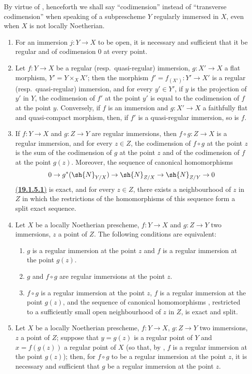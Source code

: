 By virtue of , henceforth we shall say ``codimension'' instead of ``transverse codimension'' when speaking of a subprescheme $Y$ regularly immersed in $X$, even when $X$ is not locally Noetherian.

\begin{proposition}[19.1.5]
\label{IV.19.1.5}
\medskip\noindent
\begin{enumerate}[label=(\roman*)]
  \item For an immersion $j:Y\to X$ to be open, it is necessary and sufficient that it be regular and of codimension $0$ at every point.
  \item Let $f:Y\to X$ be a regular (resp.\ quasi-regular) immersion, $g:X'\to X$ a flat morphism, $Y'=Y\times_X X'$; then the morphism $f'=f_{(X')}:Y'\to X'$ is a regular (resp.\ quasi-regular) immersion, and for every $y'\in Y'$, if $y$ is the projection of $y'$ in $Y$, the codimension of $f'$ at the point $y'$ is equal to the codimension of $f$ at the point $y$.
Conversely, if $f$ is an immersion and $g:X'\to X$ a faithfully flat and quasi-compact morphism, then, if $f'$ is a quasi-regular immersion, so is $f$.
  \item If $f:Y\to X$ and $g:Z\to Y$ are regular immersions, then $f\circ g:Z\to X$ is a regular immersion, and for every $z\in Z$, the codimension of $f\circ g$ at the point $z$ is the sum of the codimension of $g$ at the point $z$ and of the codimension of $f$ at the point $g(z)$.
Moreover, the sequence of canonical homomorphisms 
\[
  0\to g^*(\sh{N}_{Y/X})\to\sh{N}_{Z/X}\to\sh{N}_{Z/Y}\to 0
\]
\hyperref[IV.19.1.5.1]{(\textbf{19.1.5.1})}
\label{IV.19.1.5.1}
is exact, and for every $z\in Z$, there exists a neighbourhood of $z$ in $Z$ in which the restrictions of the homomorphisms of this sequence form a split exact sequence.
  \item Let $X$ be a locally Noetherian prescheme, $f:Y\to X$ and $g:Z\to Y$ two immersions, $z$ a point of $Z$.
The following conditions are equivalent:
  \begin{enumerate}[label=\emph{\alph*)}]
    \item $g$ is a regular immersion at the point $z$ and $f$ is a regular immersion at the point $g(z)$.
    \item $g$ and $f\circ g$ are regular immersions at the point $z$.
    \item $f\circ g$ is a regular immersion at the point $z$, $f$ is a regular immersion at the point $g(z)$, and the sequence of canonical homomorphisms , restricted to a sufficiently small open neighbourhood of $z$ in $Z$, is exact and split.
  \end{enumerate}
  \item Let $X$ be a locally Noetherian prescheme, $f:Y\to X$, $g:Z\to Y$ two immersions, $z$ a point of $Z$; suppose that $y=g(z)$ is a regular point of $Y$ and $x=f(g(z))$ a regular point
of $X$ (so that, by , $f$ is a regular immersion at the point $g(z)$); then,
for $f\circ g$ to be a regular immersion at the point $z$, it is necessary and sufficient that $g$ be a regular immersion at the point $z$.
\end{enumerate}
\end{proposition}


